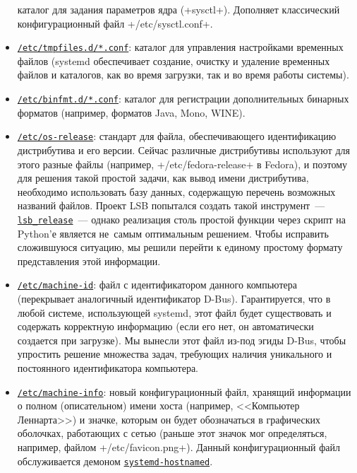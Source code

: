 \documentclass[10pt,oneside,a4paper]{article}
\newcommand{\hreftt}[2]{\href{#1}{\texttt{#2}}}
\begin{document}
\begin{itemize}
		каталог для задания параметров ядра (+sysctl+). Дополняет
		классический конфигурационный файл +/etc/sysctl.conf+.
	\item
		\hreftt{http://0pointer.de/public/systemd-man/tmpfiles.d.html}{/etc/tmpfiles.d/*.conf}:
		каталог для управления настройками временных файлов (systemd
		обеспечивает создание, очистку и удаление временных файлов и
		каталогов, как во время загрузки, так и во время работы
		системы).
	\item
		\hreftt{http://0pointer.de/public/systemd-man/binfmt.d.html}{/etc/binfmt.d/*.conf}:
		каталог для регистрации дополнительных бинарных форматов
		(например, форматов Java, Mono, WINE).
	\item
		\hreftt{http://0pointer.de/public/systemd-man/os-release.html}{/etc/os-release}:
		стандарт для файла, обеспечивающего идентификацию дистрибутива и
		его версии. Сейчас различные дистрибутивы используют для этого
		разные файлы (например, +/etc/fedora-release+ в Fedora), и
		поэтому для решения такой простой задачи, как вывод имени
		дистрибутива, необходимо использовать базу данных, содержащую
		перечень возможных названий файлов. Проект LSB попытался создать
		такой инструмент~---
		\hreftt{http://refspecs.freestandards.org/LSB_3.1.0/LSB-Core-generic/LSB-Core-generic/lsbrelease.html}{lsb\_release}~---
		однако реализация столь простой функции через скрипт на Python'е
		является не~самым оптимальным решением. Чтобы исправить
		сложившуюся ситуацию, мы решили перейти к единому простому
		формату представления этой информации.
	\item
		\hreftt{http://0pointer.de/public/systemd-man/machine-id.html}{/etc/machine-id}:
		файл с идентификатором данного компьютера (перекрывает
		аналогичный идентификатор D-Bus). Гарантируется, что в любой
		системе, использующей systemd, этот файл будет существовать и
		содержать корректную информацию (если его нет, он автоматически
		создается при загрузке). Мы вынесли этот файл из-под эгиды
		D-Bus, чтобы упростить решение множества задач, требующих
		наличия уникального и постоянного идентификатора компьютера.
	\item
		\hreftt{http://0pointer.de/public/systemd-man/machine-info.html}{/etc/machine-info}:
		новый конфигурационный файл, хранящий информации о полном 
		(описательном) имени хоста (например, <<Компьютер Леннарта>>) и
		значке, которым он будет обозначаться в графических оболочках,
		работающих с сетью (раньше этот значок мог определяться,
		например, файлом +/etc/favicon.png+). Данный конфигурационный
		файл обслуживается демоном
		\hreftt{http://www.freedesktop.org/wiki/Software/systemd/hostnamed}{systemd-hostnamed}.
\end{itemize}
\end{document}
